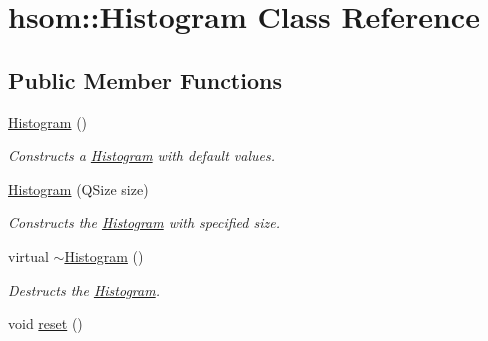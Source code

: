 \hypertarget{classhsom_1_1_histogram}{\section{hsom\-:\-:\-Histogram \-Class \-Reference}
\label{classhsom_1_1_histogram}
}
\subsection*{\-Public \-Member \-Functions}
\begin{DoxyCompactItemize}
\item 
\hypertarget{classhsom_1_1_histogram_a41eb5ce79d812d39fc9d650f3b9874f7}{\hyperlink{classhsom_1_1_histogram_a41eb5ce79d812d39fc9d650f3b9874f7}{\-Histogram} ()}\label{classhsom_1_1_histogram_a41eb5ce79d812d39fc9d650f3b9874f7}

\begin{DoxyCompactList}\small\item\em \-Constructs a \hyperlink{classhsom_1_1_histogram}{\-Histogram} with default values. \end{DoxyCompactList}\item 
\hyperlink{classhsom_1_1_histogram_aff49055a52107bd97767d2eae313272a}{\-Histogram} (\-Q\-Size size)
\begin{DoxyCompactList}\small\item\em \-Constructs the \hyperlink{classhsom_1_1_histogram}{\-Histogram} with specified size. \end{DoxyCompactList}\item 
\hypertarget{classhsom_1_1_histogram_a0b7e057690970983d770ac299076792a}{virtual \hyperlink{classhsom_1_1_histogram_a0b7e057690970983d770ac299076792a}{$\sim$\-Histogram} ()}\label{classhsom_1_1_histogram_a0b7e057690970983d770ac299076792a}

\begin{DoxyCompactList}\small\item\em \-Destructs the \hyperlink{classhsom_1_1_histogram}{\-Histogram}. \end{DoxyCompactList}\item 
\hypertarget{classhsom_1_1_histogram_ac40e46b1cfcc0761c97ec81909c2186d}{void \hyperlink{classhsom_1_1_histogram_ac40e46b1cfcc0761c97ec81909c2186d}{reset} ()}\label{classhsom_1_1_histogram_ac40e46b1cfcc0761c97ec81909c2186d}


\end{DoxyCompactItemize}
